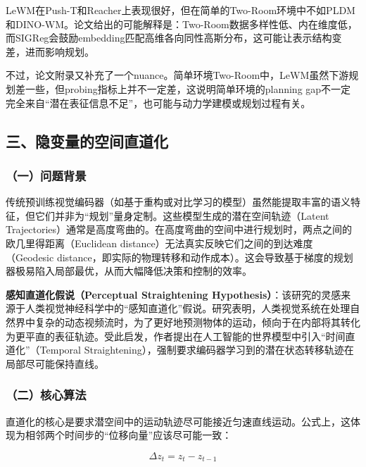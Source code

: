 LeWM在Push-T和Reacher上表现很好，但在简单的Two-Room环境中不如PLDM和DINO-WM。论文给出的可能解释是：Two-Room数据多样性低、内在维度低，而SIGReg会鼓励embedding匹配高维各向同性高斯分布，这可能让表示结构变差，进而影响规划。

不过，论文附录又补充了一个nuance。简单环境Two-Room中，LeWM虽然下游规划差一些，但probing指标上并不一定差，这说明简单环境的planning gap不一定完全来自``潜在表征信息不足''，也可能与动力学建模或规划过程有关。

\hypertarget{ux4e09ux9690ux53d8ux91cfux7684ux7a7aux95f4ux76f4ux9053ux5316}{%
\subsection{三、隐变量的空间直道化}\label{ux4e09ux9690ux53d8ux91cfux7684ux7a7aux95f4ux76f4ux9053ux5316}}

\hypertarget{ux4e00ux95eeux9898ux80ccux666f-9}{%
\subsubsection{（一）问题背景}\label{ux4e00ux95eeux9898ux80ccux666f-9}}

传统预训练视觉编码器（如基于重构或对比学习的模型）虽然能提取丰富的语义特征，但它们并非为``规划''量身定制。这些模型生成的潜在空间轨迹（Latent Trajectories）通常是高度弯曲的。在高度弯曲的空间中进行规划时，两点之间的欧几里得距离（Euclidean distance）无法真实反映它们之间的到达难度（Geodesic distance，即实际的物理转移和动作成本）。这会导致基于梯度的规划器极易陷入局部最优，从而大幅降低决策和控制的效率。

\textbf{感知直道化假说（Perceptual Straightening Hypothesis）}：该研究的灵感来源于人类视觉神经科学中的``感知直道化''假说。研究表明，人类视觉系统在处理自然界中复杂的动态视频流时，为了更好地预测物体的运动，倾向于在内部将其转化为更平直的表征轨迹。受此启发，作者提出在人工智能的世界模型中引入``时间直道化''（Temporal Straightening），强制要求编码器学习到的潜在状态转移轨迹在局部尽可能保持直线。

\hypertarget{ux4e8cux6838ux5fc3ux7b97ux6cd5-1}{%
\subsubsection{（二）核心算法}\label{ux4e8cux6838ux5fc3ux7b97ux6cd5-1}}

直道化的核心是要求潜空间中的运动轨迹尽可能接近匀速直线运动。公式上，这体现为相邻两个时间步的``位移向量''应该尽可能一致：

\[
\Delta z_t = z_t - z_{t-1}
\]

